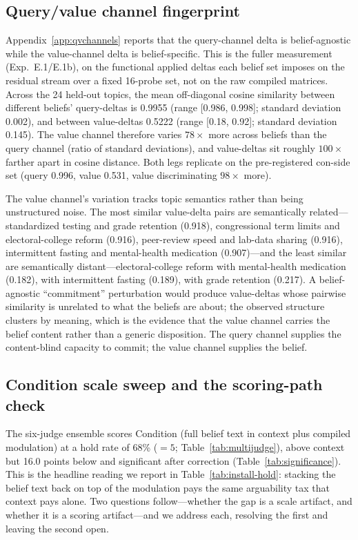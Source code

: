 \subsection{Query/value channel fingerprint}
\label{app:qv}
Appendix~\ref{app:qvchannels} reports that the query-channel delta is
belief-agnostic while the value-channel delta is belief-specific. This is the fuller
measurement (Exp.~E.1/E.1b), on the functional applied deltas each belief set imposes on
the residual stream over a fixed 16-probe set, not on the raw compiled matrices. Across the
24 held-out topics, the mean off-diagonal cosine similarity between different beliefs'
query-deltas is 0.9955 (range [0.986, 0.998]; standard deviation 0.002), and between
value-deltas 0.5222 (range [0.18, 0.92]; standard deviation 0.145). The value channel
therefore varies \(78\times\) more across beliefs than the query channel (ratio of standard
deviations), and value-deltas sit roughly \(100\times\) farther apart in cosine distance.
Both legs replicate on the pre-registered con-side set (query 0.996, value 0.531, value
discriminating \(98\times\) more).

The value channel's variation tracks topic semantics rather than being unstructured noise.
The most similar value-delta pairs are semantically related---standardized testing and
grade retention (0.918), congressional term limits and electoral-college reform (0.916),
peer-review speed and lab-data sharing (0.916), intermittent fasting and mental-health
medication (0.907)---and the least similar are semantically distant---electoral-college
reform with mental-health medication (0.182), with intermittent fasting (0.189), with grade
retention (0.217). A belief-agnostic ``commitment'' perturbation would produce value-deltas
whose pairwise similarity is unrelated to what the beliefs are about; the observed structure
clusters by meaning, which is the evidence that the value channel carries the belief content
rather than a generic disposition. The query channel supplies the content-blind capacity to
commit; the value channel supplies the belief.

\subsection{Condition \condD{} scale sweep and the scoring-path check}
\label{app:dscale}
The six-judge ensemble scores Condition \condD{} (full belief text in context plus compiled
modulation) at a hold rate of 68\% (\(=5\); Table~\ref{tab:multijudge}), above context but
16.0 points below \condF{} and significant after correction (Table~\ref{tab:significance}). This
is the headline reading we report in Table~\ref{tab:install-hold}: stacking the belief text back
on top of the modulation pays the same arguability tax that context pays alone. Two questions
follow---whether the gap is a scale artifact, and whether it is a scoring artifact---and we
address each, resolving the first and leaving the second open.

